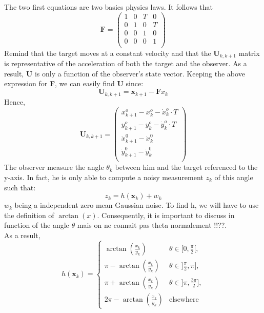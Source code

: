 \documentclass[a4paper,12pt]{report}
\begin{document}
The two first equations are two basics physics laws.  
It follows that \[\textbf{F} = 
   \left (
   \begin{array}{cccc}
      1 & 0 & T & 0 \\
      0 & 1 & 0 & T \\
      0 & 0 & 1 & 0 \\
      0 & 0 & 0 & 1 \\
   \end{array}
   \right )
\]
Remind that the target moves at a constant velocity and that the $\textbf{U}_{k,k+1}$ matrix is representative of the acceleration of both the target and the observer. As a result, \textbf{U} is only a function of the observer's state vector. Keeping the above expression for \textbf{F}, we can easily find \textbf{U} since:
\begin{equation*}
\textbf{U}_{k,k+1} = \textbf{x}_{k+1} - \textbf{F} x_{k}
\end{equation*}
Hence, \[\textbf{U}_{k,k+1} = 
   \left (
   \begin{array}{c}
   	  x^{o}_{k+1} - x^{o}_{k} - \dot{x}^{o}_{k} \cdot T \\
      y^{o}_{k+1} - y^{o}_{k} - \dot{y}^{o}_{k} \cdot T \\
      \dot{x}^{0}_{k+1} - \dot{x}^{0}_{k} \\
      \dot{y}^{0}_{k+1} - \dot{y}^{0}_{k}\\
   \end{array}
   \right )
\]
The observer measure the angle $\theta_{k}$ between him and the target referenced to the y-axis. In fact, he is only able to compute a noisy measurement $z_{k}$ of this angle such that:
\begin{equation*}
z_{k} = h(\textbf{x}_{k}) + w_{k}
\end{equation*}
$w_{k}$ being a independent zero mean Gaussian noise.
To find h, we will have to use the definition of $\arctan(x)$. Consequently, it is important to discuss in function of the angle $\theta$ {\color{red} mais on ne connait pas theta normalement !!??}.\\ As a result,
\begin{equation*}
      h(\textbf{x}_{k}) =
     \begin{cases}
      \arctan(\frac{x_{k}}{y_{k}}) &  \theta \in [0,\frac{\pi}{2}[,\\
      \pi - \arctan(\frac{x_{k}}{y_{k}}) &   \theta \in ]\frac{\pi}{2},\pi] ,\\
      \pi + \arctan(\frac{x_{k}}{y_{k}}) &   \theta \in ]\pi,\frac{3 \pi}{2}], \\
      2\pi - \arctan(\frac{x_{k}}{y_{k}}) & \text{elsewhere}
     \end{cases}
\end{equation*}
\end{document}
